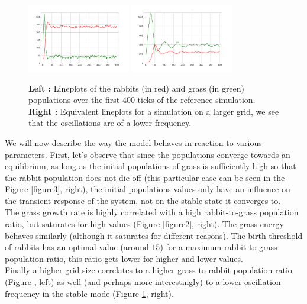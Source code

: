 \documentclass[11pt]{article}
\begin{document}
\begin{figure}[h!]
  \centering
  \includegraphics[width=0.4\textwidth]{plots/sim1.png}
  \includegraphics[width=0.4\textwidth]{plots/sim15.png}
  \caption{\textbf{Left :} Lineplots of the rabbits (in red) and grass (in green) populations over the first 400 ticks of the reference simulation. \textbf{Right :} Equivalent lineplots for a simulation on a larger grid, we see that the oscillations are of a lower frequency.}
  \label{figure1}
\end{figure}


We will now describe the way the model behaves in reaction to various parameters. First, let's observe that since the populations converge towards an equilibrium, as long as the initial populations of grass is sufficiently high so that the rabbit population does not die off (this particular case can be seen in the Figure \ref{figure3}, right), the initial populations values only have an influence on the transient response of the system, not on the stable state it converges to. \\

The grass growth rate is highly correlated with a high rabbit-to-grass population ratio, but saturates for high values (Figure \ref{figure2}, right). The grass energy behaves similarly (although it saturates for different reasons). The birth threshold of rabbits has an optimal value (around $15$) for a maximum rabbit-to-grass population ratio, this ratio gets lower for higher and lower values. \\

Finally a higher grid-size correlates to a higher grass-to-rabbit population ratio (Figure , left) as well (and perhaps more interestingly) to a lower oscillation frequency in the stable mode (Figure \ref{figure1}, right).
\end{document}
